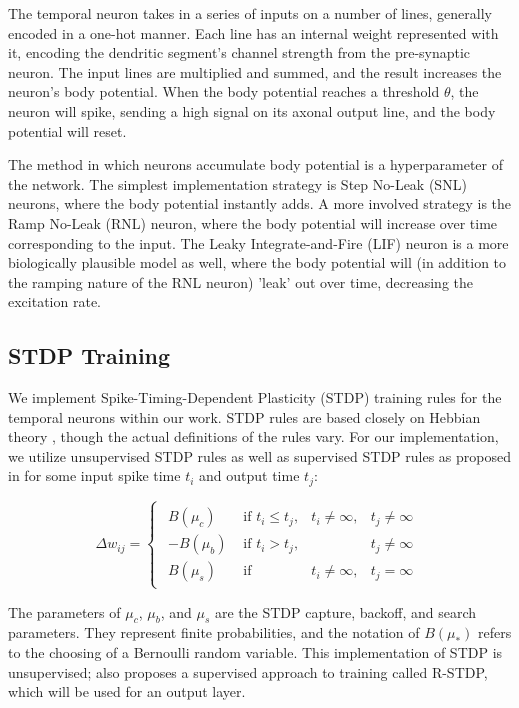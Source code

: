 The temporal neuron takes in a series of inputs on a number of lines, generally
encoded in a one-hot manner. Each line has an internal weight represented with
it, encoding the dendritic segment's channel strength from the pre-synaptic
neuron. The input lines are multiplied and summed, and the result increases the
neuron's body potential. When the body potential reaches a threshold $\theta$,
the neuron will spike, sending a high signal on its axonal output line, and the
body potential will reset.

The method in which neurons accumulate body potential is a hyperparameter of the
network. The simplest implementation strategy is Step No-Leak (SNL) neurons,
where the body potential instantly adds. A more involved strategy is the
Ramp No-Leak (RNL) neuron, where the body potential will increase over time
corresponding to the input. The Leaky Integrate-and-Fire (LIF) neuron is a more
biologically plausible model as well, where the body potential will (in addition
to the ramping nature of the RNL neuron) 'leak' out over time, decreasing the
excitation rate.

\subsection{STDP Training}

We implement Spike-Timing-Dependent Plasticity (STDP) training rules for the
temporal neurons within our work. STDP rules are based closely on Hebbian theory
\cite{STDP}, though the actual definitions of the rules vary. For our
implementation, we utilize unsupervised STDP rules as well as supervised STDP
rules as proposed in \cite{TNN} for some input spike time $t_i$ and output time
$t_j$:

$$
    \Delta w_{ij} = \begin{cases}
        \begin{matrix}
            B(\mu_c)  & \text{ if } t_i\leq t_j, & t_i\neq \infty, & t_j\neq\infty \\
            -B(\mu_b) & \text{ if } t_i > t_j,   &                 & t_j\neq\infty \\
            B(\mu_s)  & \text{ if }              & t_i\neq \infty, & t_j=\infty
        \end{matrix}
    \end{cases}
$$

The parameters of $\mu_c$, $\mu_b$, and $\mu_s$ are the STDP capture, backoff,
and search parameters. They represent finite probabilities, and the notation of
$B(\mu_*)$ refers to the choosing of a Bernoulli random variable. This
implementation of STDP is unsupervised; \cite{TNN} also proposes a supervised
approach to training called R-STDP, which will be used for an output layer.

